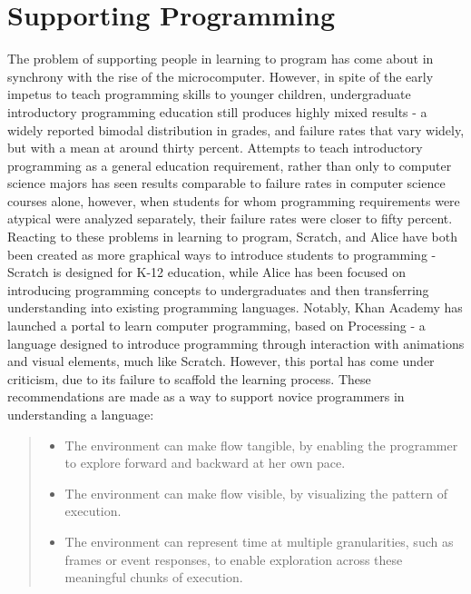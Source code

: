 \documentclass[12pt,a4paper,titlepage]{scrreprt}
\begin{document}
\section{Supporting Programming}
The problem of supporting people in learning to program has come about in synchrony with the rise of the microcomputer\cite{papert_teaching_1971,papert_teaching_1971_1,papert_computer_1971,papert_twenty_1971,papert_making_1972}. However, in spite of the early impetus to teach programming skills to younger children, undergraduate introductory programming education still produces highly mixed results - a widely reported bimodal distribution in grades\cite{dehnadi_camel_2006}\cite{robins_learning_2010}, and failure rates that vary widely\cite{bennedsen_failure_2007}, but with a mean at around thirty percent. Attempts to teach introductory programming as a general education requirement, rather than only to computer science majors has seen results comparable to failure rates in computer science courses alone\cite{guzdial_education:_2009}, however, when students for whom programming requirements were atypical were analyzed separately, their failure rates were closer to fifty percent. Reacting to these problems in learning to program, Scratch\cite{maloney_scratch:_2004}, and Alice\cite{moskal_evaluating_2004} have both been created as more graphical ways to introduce students to programming - Scratch is designed for K-12 education\cite{malan_scratch_2007}, while Alice has been focused on introducing programming concepts to undergraduates and then transferring understanding into existing programming languages\cite{dann_mediated_2012}.
Notably, Khan Academy\cite{_computer_????} has launched a portal to learn computer programming, based on Processing - a language designed to introduce programming through interaction with animations and visual elements, much like Scratch\cite{peppler_supergoo_2007}. However, this portal has come under criticism\cite{victor_learnable_2012}, due to its failure to scaffold the learning process. These recommendations are made as a way to support novice programmers in understanding a language:
\begin{quote}
\begin{itemize}
\item The environment can make flow tangible, by enabling the programmer to explore forward and backward at her own pace.
\item The environment can make flow visible, by visualizing the pattern of execution.
\item The environment can represent time at multiple granularities, such as frames or event responses, to enable exploration across these meaningful chunks of execution.
\end{itemize}
\end{quote}
\end{document}

